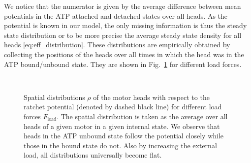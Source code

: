 \documentclass[aps,pre,twocolumn,showpacs,showkeys,superscriptaddress,floatfix]{revtex4-1}
\begin{document}
We notice that the numerator is given by the average difference between mean potentials in the ATP attached and detached states over all heads. 
As the potential is known in our model, the only missing information is thus the steady state distribution 
or to be more precise the average steady state density for all heads \eqref{eq:eff_distribution}.  
These distributions are empirically obtained by collecting the positions of the heads over all times in which the head was in the ATP bound/unbound state.
They are shown in Fig.~\ref{fig:pos_distr} for different load forces. 
\begin{figure}[t]
\centering
{}
\\
\caption{
\label{fig:pos_distr}
Spatial distributions $\rho$ of the motor heads with respect to the ratchet potential (denoted by dashed black line) for different load forces $F_\text{load}$.
The spatial distribution is taken as the average over all heads of a given motor in a given internal state.
We observe that heads in the ATP unbound state follow the potential closely while those in the bound state do not. 
Also by increasing the external load, all distributions universally become flat. 
}
\end{figure}
\end{document}
